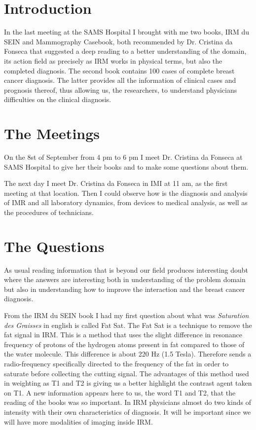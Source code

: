 \section{Introduction}

In the last meeting at the SAMS Hospital I brought with me two books, IRM du SEIN and Mammography Casebook, both recommended by Dr. Cristina da Fonseca that suggested a deep reading to a better understanding of the domain, its action field as precisely as IRM works in physical terms, but also the completed diagnosis. The second book contains 100 cases of complete breast cancer diagnosis. The latter provides all the information of clinical cases and prognosis thereof, thus allowing us, the researchers, to understand physicians difficulties on the clinical diagnosis.

\clearpage

\section{The Meetings}

On the 8st of September from 4 pm to 6 pm I meet Dr. Cristina da Fonseca at SAMS Hospital to give her their books and to make some questions about them.

The next day I meet Dr. Cristina da Fonseca in IMI at 11 am, as the first meeting at that location. Then I could observe how is the diagnosis and analysis of IMR and all laboratory dynamics, from devices to medical analysis, as well as the procedures of technicians.

\section{The Questions}

As usual reading information that is beyond our field produces interesting doubt where the answers are interesting both in understanding of the problem domain but also in understanding how to improve the interaction and the breast cancer diagnosis.

From the IRM du SEIN book I had my first question about what was {\it Saturation des Graisses} in english is called Fat Sat. The Fat Sat is a technique to remove the fat signal in IRM. This is a method that uses the slight difference in resonance frequency of protons of the hydrogen atoms present in fat compared to those of the water molecule. This difference is about 220 Hz (1.5 Tesla). Therefore sends a radio-frequency specifically directed to the frequency of the fat in order to saturate before collecting the cutting signal. The advantages of this method used in weighting as T1 and T2 is giving us a better highlight the contrast agent taken on T1. A new information appears here to us, the word T1 and T2, that the reading of the books was so important. In IRM physicians almost do two kinds of intensity with their own characteristics of diagnosis. It will be important since we will have more modalities of imaging inside IRM.

